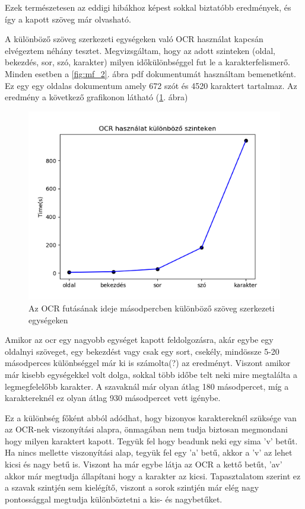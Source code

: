 Ezek természetesen az eddigi hibákhoz képest sokkal biztatóbb eredmények, és így a kapott szöveg már olvasható.

A különböző szöveg szerkezeti egységeken való OCR használat kapcsán elvégeztem néhány tesztet. Megvizsgáltam, hogy az adott szinteken (oldal, bekezdés, sor, szó, karakter) milyen időkülönbséggel fut le a karakterfelismerő. Minden esetben a \ref{fig:mf_2}. ábra pdf dokumentumát használtam bemenetként. Ez egy egy oldalas dokumentum amely 672 szót és 4520 karaktert tartalmaz. Az eredmény a következő grafikonon látható (\ref{fig:test ocr}. ábra)

\begin{figure}[H]
\centering
\includegraphics[scale=1]{images/test_ocr.png}
\caption{Az OCR futásának ideje másodpercben különböző szöveg szerkezeti egységeken}
\label{fig:test ocr}
\end{figure}

Amikor az ocr egy nagyobb egységet kapott feldolgozásra, akár egybe egy oldalnyi szöveget, egy bekezdést vagy csak egy sort, csekély, mindössze 5-20 másodperces különbséggel már ki is számolta(?) az eredményt. Viszont amikor már kisebb egységekkel volt dolga, sokkal több időbe telt neki mire megtalálta a legmegfelelőbb karakter. A szavaknál már olyan átlag 180 másodpercet, míg a karaktereknél ez olyan átlag 930 másodpercet vett igénybe.

Ez a különbség főként abból adódhat, hogy bizonyos karaktereknél szüksége van az OCR-nek viszonyítási alapra, önmagában nem tudja biztosan megmondani hogy milyen karaktert kapott. Tegyük fel hogy beadunk neki egy sima 'v' betűt. Ha nincs mellette viszonyítási alap, tegyük fel egy 'a' betű, akkor a 'v' az lehet kicsi és nagy betű is. Viszont ha már egybe látja az OCR a kettő betűt, 'av' akkor már megtudja állapítani hogy a karakter az kicsi. Tapasztalatom szerint ez a szavak szintjén sem kielégítő, viszont a sorok szintjén már elég nagy pontossággal megtudja különböztetni a kis- és nagybetűket.


